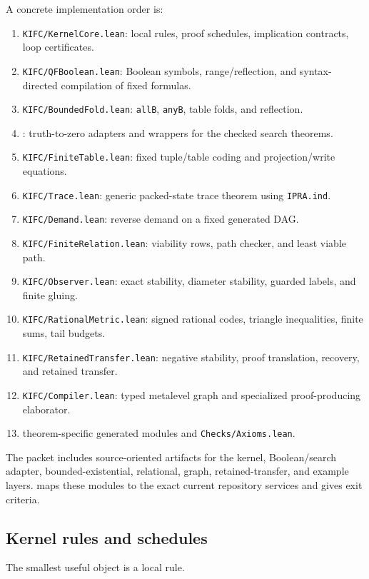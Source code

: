 A concrete implementation order is:
\begin{enumerate}[label=\textbf{M\arabic*.}]
  \item \texttt{KIFC/KernelCore.lean}: local rules, proof schedules, implication contracts, loop certificates.
  \item \texttt{KIFC/QFBoolean.lean}: Boolean symbols, range/reflection, and syntax-directed compilation of fixed formulas.
  \item \texttt{KIFC/BoundedFold.lean}: \texttt{allB}, \texttt{anyB}, table folds, and reflection.
  \item {}: truth-to-zero adapters and wrappers for the checked search theorems.
  \item \texttt{KIFC/FiniteTable.lean}: fixed tuple/table coding and projection/write equations.
  \item \texttt{KIFC/Trace.lean}: generic packed-state trace theorem using \texttt{IPRA.ind}.
  \item \texttt{KIFC/Demand.lean}: reverse demand on a fixed generated DAG.
  \item \texttt{KIFC/FiniteRelation.lean}: viability rows, path checker, and least viable path.
  \item \texttt{KIFC/Observer.lean}: exact stability, diameter stability, guarded labels, and finite gluing.
  \item \texttt{KIFC/RationalMetric.lean}: signed rational codes, triangle inequalities, finite sums, tail budgets.
  \item \texttt{KIFC/RetainedTransfer.lean}: negative stability, proof translation, recovery, and retained transfer.
  \item \texttt{KIFC/Compiler.lean}: typed metalevel graph and specialized proof-producing elaborator.
  \item theorem-specific generated modules and \texttt{Checks/Axioms.lean}.
\end{enumerate}
The packet includes source-oriented artifacts for the kernel, Boolean/search adapter, bounded-existential, relational, graph, retained-transfer, and example layers.   maps these modules to the exact current repository services and gives exit criteria.

\subsection{Kernel rules and schedules}

The smallest useful object is a local rule.

